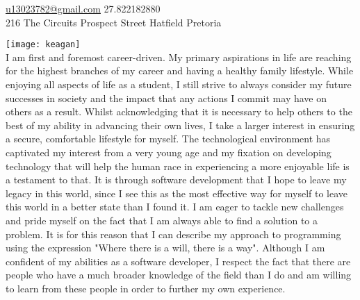 \sloppy  %



\nobreakvspace{0.3em}  %

\noindent\href{mailto:u13023782.at.gmail.dot.com}{u13023782\mbox{}@\mbox{}gmail.com}\sbull
\textsmaller{+}27.822182880\sbull
\\
216 The Circuits Prospect Street\sbull
Hatfield\sbull
Pretoria\\

\spacedhrule{0.9em}{-0.4em}  %
\begin{center}
\end{center}


\vspace{-1.3em}  %
\begin{multicols}{3}%

\noindent \texttt{[image: keagan]}\\I am first and foremost career-driven. My primary aspirations in life are reaching for the highest branches of my career and having a healthy family lifestyle. While enjoying all aspects of life as a student, I still strive to always consider my future successes in society and the impact that any actions I commit may have on others as a result. Whilst acknowledging that it is necessary to help others to the best of my ability in advancing their own lives, I take a larger interest in ensuring a secure, comfortable lifestyle for myself. The technological environment has captivated my interest from a very young age and my fixation on developing technology that will help the human race in experiencing a more enjoyable life is a testament to that. It is through software development that I hope to leave my legacy in this world, since I see this as the most effective way for myself to leave this world in a better state than I found it. I am eager to tackle new challenges and pride myself on the fact that I am always able to find a solution to a problem. It is for this reason that I can describe my approach to programming using the expression "Where there is a will, there is a way". Although I am confident of my abilities as a software developer, I respect the fact that there are people who have a much broader knowledge of the field than I do and am willing to learn from these people in order to further my own experience.
\end{multicols}

